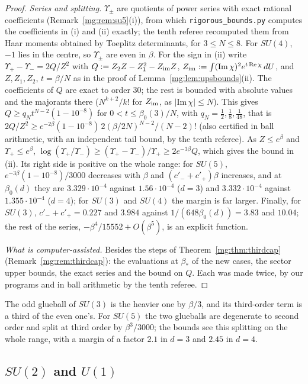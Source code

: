 \documentclass[11pt,a4paper]{article}
\theoremstyle{definition}
\theoremstyle{remark}
\newcommand{\dU}{\,dU}
\begin{document}
\begin{proof}
\emph{Series and splitting.} $\Upsilon_\pm$ are quotients of power series with exact rational coefficients (Remark~\ref{mg:rem:su5}(i)), from which \texttt{rigorous\_bounds.py}
computes the coefficients in (i) and (ii) exactly; the tenth referee recomputed them from Haar moments obtained by Toeplitz determinants, for $3\le N\le8$. For $SU(4)$, $-1$ lies in the centre,
so $\Upsilon_\pm$ are even in $\beta$. For the sign in (ii) write $\Upsilon_+-\Upsilon_-=2Q/Z^2$ with $Q:=Z_2Z-Z_1^2-Z_{\rm im}Z$, $Z_{\rm im}:=\int(\mathrm{Im}\,\chi)^2e^{t\,\mathrm{Re}\,\chi}\dU$, and
$Z,Z_1,Z_2$, $t=\beta/N$ as in the proof of Lemma~\ref{mg:lem:upsbounds}(ii). The coefficients of $Q$ are exact to order $30$; the rest is bounded with absolute values and the majorants there
($N^{k+2}/k!$ for $Z_{\rm im}$, as $|\mathrm{Im}\,\chi|\le N$). This gives $Q\ge q_N t^{N-2}(1-10^{-8})$ for $0<t\le\beta_0(3)/N$, with $q_N=\frac12,\frac18,\frac1{48}$, that is
$2Q/Z^2\ge e^{-2\beta}(1-10^{-8})\,2(\beta/2N)^{N-2}/(N-2)!$ (also certified in ball arithmetic, with an independent tail bound, by the tenth referee). As $Z\le e^\beta$ and $\Upsilon_+\le e^\beta$,
$\log(\Upsilon_+/\Upsilon_-)\ge(\Upsilon_+-\Upsilon_-)/\Upsilon_+\ge2e^{-3\beta}Q$, which gives the bound in (ii). Its right side is positive on the whole range: for $SU(5)$, $e^{-3\beta}(1-10^{-8})/3000$
decreases with $\beta$ and $(c'_-+c'_+)\beta$ increases, and at $\beta_0(d)$ they are $3.329\cdot10^{-4}$ against $1.56\cdot10^{-4}$ ($d=3$) and $3.332\cdot10^{-4}$ against $1.355\cdot10^{-4}$
($d=4$); for $SU(3)$ and $SU(4)$ the margin is far larger. Finally, for $SU(3)$, $c'_-+c'_+=0.227$ and $3.984$ against $1/(648\beta_0(d))=3.83$ and $10.04$; the rest of the series,
$-\beta^4/15552+O(\beta^5)$, is an explicit function.

\emph{What is computer-assisted.} Besides the steps of Theorem~\ref{mg:thm:thirdcap} (Remark~\ref{mg:rem:thirdcap}): the evaluations at $\beta_*$ of the new cases, the sector upper bounds,
the exact series and the bound on $Q$. Each was made twice, by our programs and in ball arithmetic by the tenth referee.
\end{proof}

The odd glueball of $SU(3)$ is the heavier one by $\beta/3$, and its third-order term is a third of the even one's. For $SU(5)$ the two glueballs are degenerate to second order and split at
third order by $\beta^3/3000$; the bounds see this splitting on the whole range, with a margin of a factor $2.1$ in $d=3$ and $2.45$ in $d=4$.

\subsection*{\texorpdfstring{$SU(2)$ and $U(1)$}{SU(2) and U(1)}}
\end{document}
